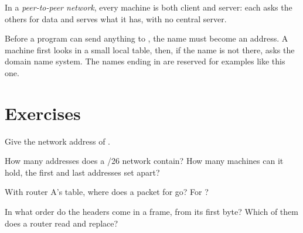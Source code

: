 \begin{definition}\label{def:g11:network-protocols:p2p}
In a \emph{peer-to-peer network}, every machine is both client and server: each asks the
others for data and serves what it has, with no central server.
\end{definition}

Before a program can send anything to , the name must become an address. A machine first looks
in a small local table, then, if the name is not there, asks the domain name system. The names ending in
 are reserved for examples like this one.

\label{lst:g11:network-protocols:hosts}

\label{out:g11:network-protocols:hosts}

\section{Exercises}\label{sec:g11:network-protocols:exercises}

\begin{exercise}[$\star$]\label{exo:g11:network-protocols:1}
Give the network address of .
\end{exercise}

\begin{exercise}[$\star$]\label{exo:g11:network-protocols:2}
How many addresses does a /26 network contain? How many machines can it hold, the first and last addresses set
apart?
\end{exercise}

\begin{exercise}[$\star$]\label{exo:g11:network-protocols:3}
With router A's table, where does a packet for  go? For ?
\end{exercise}

\begin{exercise}[$\star$]\label{exo:g11:network-protocols:4}
In what order do the headers come in a frame, from its first byte? Which of them does a router read and replace?
\end{exercise}

